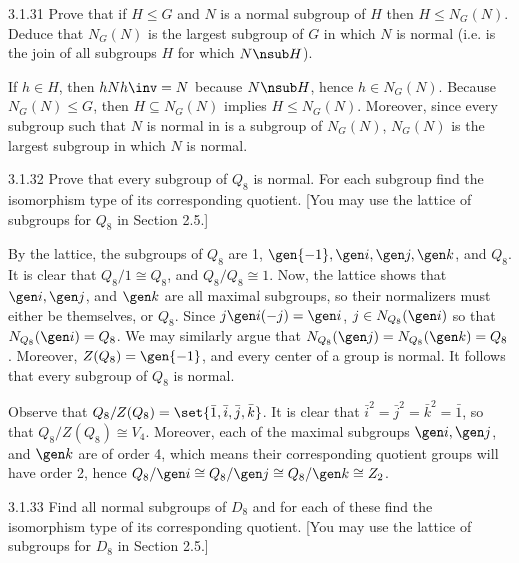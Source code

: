 \begin{exercise}{3.1.31}
    Prove that if $H \leq G$ and $N$ is a normal subgroup of $H$ then $H \leq N_G(N)$.
	Deduce that $N_G(N)$ is the largest subgroup of $G$ in which $N$ is normal (i.e.
	is the join of all subgroups $H$ for which $N \nsub H$).
\end{exercise}

\begin{sol}
    If $h \in H$, then $hNh\inv = N$ because $N \nsub H$, hence $h \in N_G(N)$.
	Because $N_G(N) \leq G$, then $H \subseteq N_G(N)$ implies $H \leq N_G(N)$.
	Moreover, since every subgroup such that $N$ is normal in is a subgroup of $N_G(N)$, $N_G(N)$ is the largest subgroup in which $N$ is normal.
\end{sol}

\begin{exercise}{3.1.32}
    Prove that every subgroup of $Q_8$ is normal.
	For each subgroup find the isomorphism type of its corresponding quotient. [You may use the lattice of subgroups for $Q_8$ in Section 2.5.]
\end{exercise}

\begin{sol}
    By the lattice, the subgroups of $Q_8$ are 1, $\gen{-1}, \gen i, \gen j, \gen k$, and $Q_8$.
	It is clear that $Q_8/1 \cong Q_8$, and $Q_8/Q_8 \cong 1$.
	Now, the lattice shows that $\gen i, \gen j$, and $\gen k$ are all maximal subgroups, so their normalizers must either be themselves, or $Q_8$.
	Since $j\gen i (-j) = \gen i$, $j \in N_{Q_8}(\gen i)$ so that $N_{Q_8}(\gen i) = Q_8$.
	We may similarly argue that $N_{Q_8}(\gen j) = N_{Q_8}(\gen k) = Q_8$.
	Moreover, $Z(Q_8) = \gen{-1}$, and every center of a group is normal.
	It follows that every subgroup of $Q_8$ is normal.
    
    Observe that $Q_8/Z(Q_8) = \set{\bar 1, \bar i, \bar j, \bar k}$.
	It is clear that $\bar i^2 = \bar j^2 = \bar k^2 = \bar 1$, so that $Q_8/Z(Q_8) \cong V_4$.
	Moreover, each of the maximal subgroups $\gen i, \gen j$, and $\gen k$ are of order 4, which means their corresponding quotient groups will have order 2, hence $Q_8/\gen i \cong Q_8/\gen j \cong Q_8/\gen k \cong Z_2$.
\end{sol}

\begin{exercise}{3.1.33}
    Find all normal subgroups of $D_8$ and for each of these find the isomorphism type of its corresponding quotient. [You may use the lattice of subgroups for $D_8$ in Section 2.5.]
\end{exercise}

